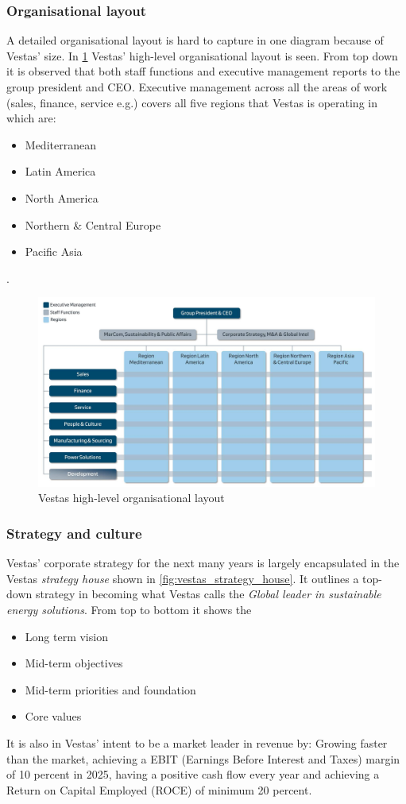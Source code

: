 \subsubsection{Organisational layout}

A detailed organisational layout is hard to capture in one diagram because of Vestas' size. In \cref{fig:vestas_organ_layout_1} Vestas' high-level organisational layout is seen. From top down it is observed that both staff functions and executive management reports to the group president and CEO. Executive management across all the areas of work (sales, finance, service e.g.) covers all five regions that Vestas is operating in which are:
\begin{itemize}
	\item Mediterranean
	\item Latin America
	\item North America
	\item Northern \& Central Europe
	\item Pacific Asia
\end{itemize}.
\begin{figure}[ht]
	\centering
	\includegraphics[width=0.8\linewidth]{Graphics/vestasOrganisationalLayout1.jpg}
	\caption{Vestas high-level organisational layout}
	\label{fig:vestas_organ_layout_1}
\end{figure}

\newpage
\subsubsection{Strategy and culture}
Vestas' corporate strategy for the next many years is largely encapsulated in the Vestas \textit{strategy house} shown in \cref{fig:vestas_strategy_house}. It outlines a top-down strategy in becoming what Vestas calls the \textit{Global leader in sustainable energy solutions}. From top to bottom it shows the
\begin{itemize}
	\item Long term vision
	\item Mid-term objectives
	\item Mid-term priorities and foundation
	\item Core values
\end{itemize}
It is also in Vestas' intent to be a market leader in revenue by: Growing faster than the market, achieving a EBIT (Earnings Before Interest and Taxes) margin of 10 percent in 2025, having a positive cash flow every year and achieving a Return on Capital Employed (ROCE) of minimum 20 percent. 


